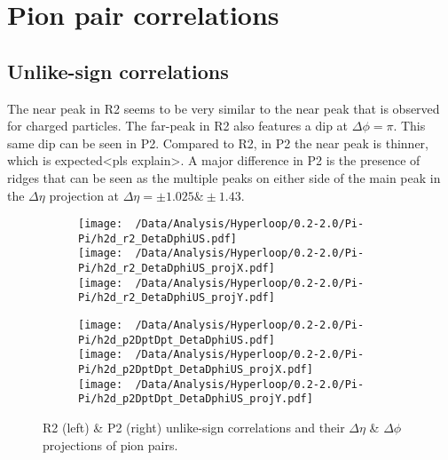 \documentclass[12pt,a4paper,twoside]{report}
\begin{document}
\section{Pion pair correlations}
\subsection{Unlike-sign correlations}
The near peak in R2 seems to be very similar to the near peak that is observed for charged particles. The far-peak in R2 also features a dip at $\Delta\phi=\pi$.
This same dip can be seen in P2. Compared to R2, in P2 the near peak is thinner, which is expected<pls explain>. A major difference in P2 is the presence of ridges that can be seen as the multiple peaks on either side of the main peak in the $\Delta\eta$ projection at $\Delta\eta=\pm1.025\&\pm1.43$.
\begin{figure}[H]
	\begin{subfigure}{0.49\linewidth}
		\texttt{[image: ~/Data/Analysis/Hyperloop/0.2-2.0/Pi-Pi/h2d\_r2\_DetaDphiUS.pdf]}\\
		\texttt{[image: ~/Data/Analysis/Hyperloop/0.2-2.0/Pi-Pi/h2d\_r2\_DetaDphiUS\_projX.pdf]}\\
		\texttt{[image: ~/Data/Analysis/Hyperloop/0.2-2.0/Pi-Pi/h2d\_r2\_DetaDphiUS\_projY.pdf]}\\
	\end{subfigure}
	\begin{subfigure}{0.49\linewidth}
		\texttt{[image: ~/Data/Analysis/Hyperloop/0.2-2.0/Pi-Pi/h2d\_p2DptDpt\_DetaDphiUS.pdf]}\\
		\texttt{[image: ~/Data/Analysis/Hyperloop/0.2-2.0/Pi-Pi/h2d\_p2DptDpt\_DetaDphiUS\_projX.pdf]}\\
		\texttt{[image: ~/Data/Analysis/Hyperloop/0.2-2.0/Pi-Pi/h2d\_p2DptDpt\_DetaDphiUS\_projY.pdf]}\\
	\end{subfigure}
	\caption{R2 (left) \& P2 (right) unlike-sign correlations and their $\Delta\eta$ \& $\Delta\phi$ projections of pion pairs.}
\end{figure}
\end{document}
